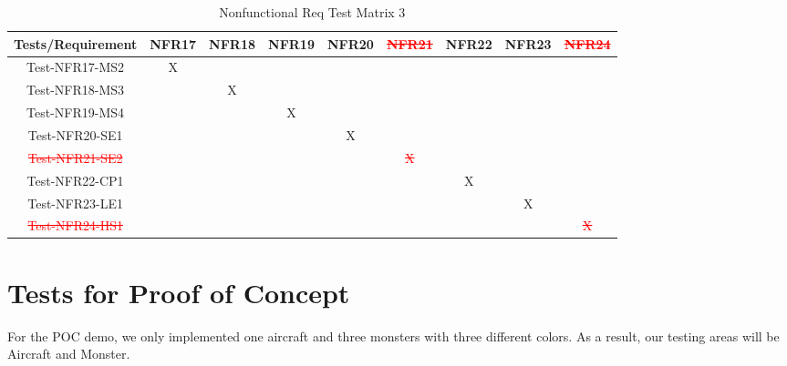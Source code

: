 \documentclass[12pt]{article}
\begin{document}
\begin{table}[htp]
\centering
\caption{Nonfunctional Req Test Matrix 3}
\begin{tabular}{|c|c|c|c|c|c|c|c|c|}
\hline
Tests/Requirement & NFR17 & NFR18 & NFR19 & NFR20 & \textcolor{red}{\st{NFR21}}  & NFR22 & NFR23 & \textcolor{red}{\st{NFR24}}\\  \hline
Test-NFR17-MS2    & X     &       &       &       &       &       &       &       \\  \hline
Test-NFR18-MS3    &       & X     &       &       &       &       &       &       \\  \hline
Test-NFR19-MS4    &       &       & X     &       &       &       &       &       \\  \hline
Test-NFR20-SE1    &       &       &       & X     &       &       &       &       \\  \hline
\textcolor{red}{\st{Test-NFR21-SE2}}    &       &       &       &       &\textcolor{red}{\st{X}}     &       &       &       \\  \hline
Test-NFR22-CP1    &       &       &       &       &       & X     &       &       \\  \hline
Test-NFR23-LE1    &       &       &       &       &       &       & X     &       \\ \hline
\textcolor{red}{\st{Test-NFR24-HS1}}    &       &       &       &       &       &       &       & \textcolor{red}{\st{X}}    \\ \hline
\end{tabular}
\end{table}
\newpage
\section{Tests for Proof of Concept}
For the POC demo, we only implemented one aircraft and 
three monsters with three different colors. As a result,
our testing areas will be Aircraft and Monster.
\end{document}
